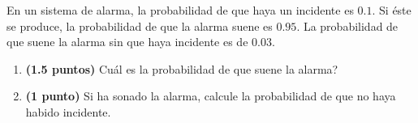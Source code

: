 
En un sistema de alarma, la probabilidad de que haya un incidente es $0.1$. Si éste se produce, la probabilidad de que la alarma suene es $0.95$. La probabilidad de que suene la alarma sin que haya incidente es de $0.03$.
\begin{enumerate}[label=\alph*)]
\item \textbf{(1.5 puntos)} \textquestiondown{}Cuál es la probabilidad de que suene la alarma?
\item \textbf{(1 punto)} Si ha sonado la alarma, calcule la probabilidad de que no haya habido incidente.
\end{enumerate}
